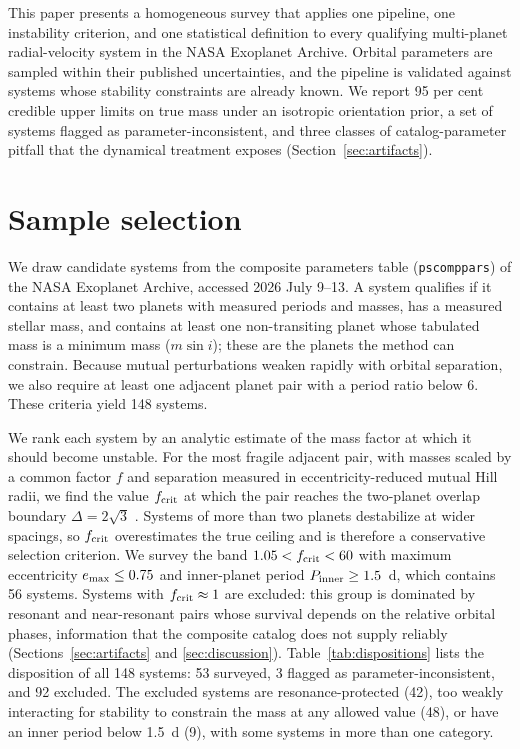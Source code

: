 \documentclass[fleqn,usenatbib]{mnras}
\newcommand{\msini}{m\sin i}
\begin{document}
This paper presents a homogeneous survey that applies one pipeline, one
instability criterion, and one statistical definition to every qualifying
multi-planet radial-velocity system in the NASA Exoplanet Archive. Orbital
parameters are sampled within their published uncertainties, and the
pipeline is validated against systems whose stability constraints are
already known. We report 95 per cent credible upper limits on true mass
under an isotropic orientation prior, a set of systems flagged as
parameter-inconsistent, and three classes of catalog-parameter pitfall
that the dynamical treatment exposes (Section~\ref{sec:artifacts}).

\section{Sample selection} \label{sec:sample}

We draw candidate systems from the composite parameters table
(\texttt{pscomppars}) of the NASA Exoplanet Archive, accessed 2026
July 9--13. A system qualifies if it contains at least two planets with
measured periods and masses, has a measured stellar mass, and contains at
least one non-transiting planet whose tabulated mass is a minimum mass
($\msini$); these are the planets the method can constrain. Because mutual
perturbations weaken rapidly with orbital separation, we also require at
least one adjacent planet pair with a period ratio below 6. These criteria
yield 148 systems.

We rank each system by an analytic estimate of the mass factor at which it
should become unstable. For the most fragile adjacent pair, with masses
scaled by a common factor $f$ and separation measured in
eccentricity-reduced mutual Hill radii, we find the value $f_{\rm crit}$
at which the pair reaches the two-planet overlap boundary
$\Delta = 2\sqrt{3}$ \citep{Gladman1993}. Systems of more than two planets
destabilize at wider spacings, so $f_{\rm crit}$ overestimates the true
ceiling and is therefore a conservative selection criterion. We survey the
band $1.05 < f_{\rm crit} < 60$ with maximum eccentricity
$e_{\rm max} \le 0.75$ and inner-planet period $P_{\rm inner} \ge 1.5$~d,
which contains 56 systems. Systems with $f_{\rm crit} \approx 1$ are
excluded: this group is dominated by resonant and near-resonant pairs
whose survival depends on the relative orbital phases, information that the
composite catalog does not supply reliably
(Sections~\ref{sec:artifacts} and \ref{sec:discussion}).
Table~\ref{tab:dispositions} lists the disposition of all 148 systems: 53
surveyed, 3 flagged as parameter-inconsistent, and 92 excluded. The
excluded systems are resonance-protected (42), too weakly interacting for
stability to constrain the mass at any allowed value (48), or have an
inner period below 1.5~d (9), with some systems in more than one category.
\end{document}
